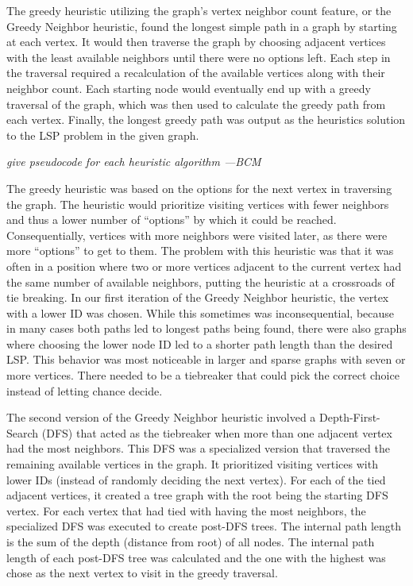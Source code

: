 \documentclass[twocolumn,showpacs,%
  nofootinbib,aps,superscriptaddress,%
  eqsecnum,prd,notitlepage,showkeys,11pt]{article}
\begin{document}
The greedy heuristic utilizing the graph's vertex neighbor count feature, or the Greedy Neighbor heuristic, found the longest simple path in a graph by starting at each vertex. It would then traverse the graph by choosing adjacent vertices with the least available neighbors until there were no options left. Each step in the traversal required a recalculation of the available vertices along with their neighbor count. Each starting node would eventually end up with a greedy traversal of the graph, which was then used to calculate the greedy path from each vertex. Finally, the longest greedy path was output as the heuristics solution to the LSP problem in the given graph.

{\em give pseudocode for each heuristic algorithm ---BCM}

The greedy heuristic was based on the options for the next vertex in traversing the graph. The heuristic would prioritize visiting vertices with fewer neighbors and thus a lower number of ``options'' by which it could be reached. Consequentially, vertices with more neighbors were visited later, as there were more ``options'' to get to them. The problem with this heuristic was that it was often in a position where two or more vertices adjacent to the current vertex had the same number of available neighbors, putting the heuristic at a crossroads of tie breaking. In our first iteration of the Greedy Neighbor heuristic, the vertex with a lower ID was chosen. While this sometimes was inconsequential, because in many cases both paths led to longest paths being found, there were also graphs where choosing the lower node ID led to a shorter path length than the desired LSP. This behavior was most noticeable in larger and sparse graphs with seven or more vertices. There needed to be a tiebreaker that could pick the correct choice instead of letting chance decide. 

The second version of the Greedy Neighbor heuristic involved a Depth-First-Search (DFS) that acted as the tiebreaker when more than one adjacent vertex had the most neighbors. This DFS was a specialized version that traversed the remaining available vertices in the graph. It prioritized visiting vertices with lower IDs (instead of randomly deciding the next vertex). For each of the tied adjacent vertices, it created a tree graph with the root being the starting DFS vertex. For each vertex that had tied with having the most neighbors, the specialized DFS was executed to create post-DFS trees. The internal path length is the sum of the depth (distance from root) of all nodes. The internal path length of each post-DFS tree was calculated and the one with the highest was chose as the next vertex to visit in the greedy traversal. 
\end{document}
